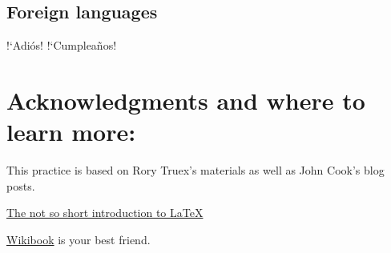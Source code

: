 \documentclass[11pt]{article} %
\begin{document}
\subsection*{Foreign languages}

!`Adi\'os!
!`Cumplea\~nos!

\section{Acknowledgments and where to learn more:}

This practice is based on Rory Truex's materials as well as John Cook's blog posts.

\href{http://tobi.oetiker.ch/lshort/lshort.pdf}{The not so short introduction to \LaTeX{}}

\href{http://en.wikibooks.org/wiki/LaTeX/}{Wikibook} is your best friend.
\end{document}
